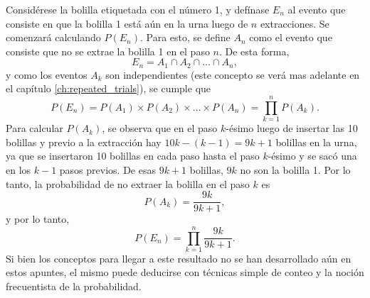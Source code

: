 \documentclass[a4paper]{report}
\begin{document}
Considérese la bolilla etiquetada con el número 1, y defínase \(E_n\) al evento que consiste en que la bolilla 1 está aún en la urna luego de \(n\) extracciones. Se comenzará calculando \(P(E_n)\). Para esto, se define \(A_n\) como el evento que consiste que no se extrae la bolilla 1 en el paso \(n\). De esta forma,
\[
 E_n=A_1\cap A_2\cap\dots\cap A_n,
\]
y como los eventos \(A_k\) son independientes (este concepto se verá mas adelante en el capítulo \ref{ch:repeated_trials}), se cumple que
\[
 P(E_n)=P(A_1)\times P(A_2)\times\dots\times P(A_n)=\prod_{k=1}^nP(A_k).
\]
Para calcular \(P(A_k)\), se observa que en el paso \(k\)-ésimo luego de insertar las 10 bolillas y previo a la extracción hay \(10k-(k-1)=9k+1\) bolillas en la urna, ya que se insertaron 10 bolillas en cada paso hasta el paso \(k\)-ésimo y se sacó una en los \(k-1\) pasos previos. De esas \(9k+1\) bolillas, \(9k\) no son la bolilla 1. Por lo tanto, la probabilidad de no extraer la bolilla en el paso \(k\) es
\[
 P(A_k)=\frac{9k}{9k+1},
\]
y por lo tanto,
\[
 P(E_n)=\prod_{k=1}^n\frac{9k}{9k+1}.
\]
Si bien los conceptos para llegar a este resultado no se han desarrollado aún en estos apuntes, el mismo puede deducirse con técnicas simple de conteo y la noción frecuentista de la probabilidad.
\end{document}
